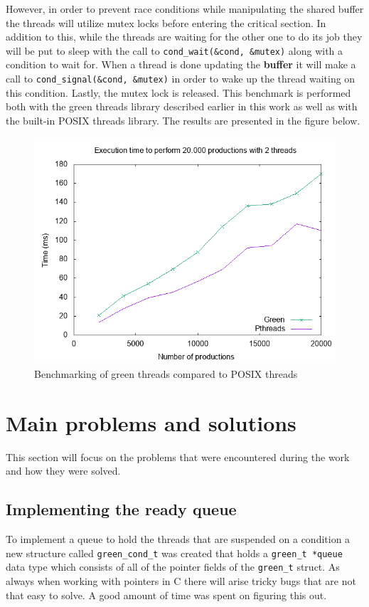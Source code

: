 \documentclass{article}
\begin{document}
However, in order to prevent race conditions while manipulating the shared buffer the threads will utilize mutex locks before entering the critical section. In addition to this, while the threads are waiting for the other one to do its job they will be put to sleep with the call to \texttt{cond\_wait(\&cond, \&mutex)} along with a condition to wait for. 
When a thread is done updating the \textbf{buffer} it will make a call to \texttt{cond\_signal(\&cond, \&mutex)} in order to wake up the thread waiting on this condition. Lastly, the mutex lock is released. 
This benchmark is performed both with the green threads library described earlier in this work as well as with the built-in POSIX threads library. The results are presented in the figure below.

\begin{figure}[h]
\centering
\includegraphics[width=1.0\textwidth]{multi.png}
\caption{Benchmarking of green threads compared to POSIX threads}
\end{figure}

\section{Main problems and solutions}
This section will focus on the problems that were encountered during the work and how they were solved. 

\subsection{Implementing the ready queue}
To implement a queue to hold the threads that are suspended on a condition a new structure called \texttt{green\_cond\_t} was created that holds a \texttt{green\_t *queue} data type which consists of all of the pointer fields of the \texttt{green\_t} struct. As always when working with pointers in C there will arise tricky bugs that are not that easy to solve. A good amount of time was spent on figuring this out. 
\end{document}
